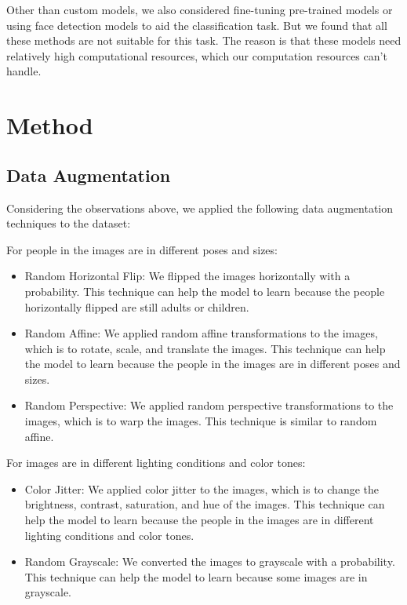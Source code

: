 \documentclass[12pt]{article}
\begin{document}
Other than custom models, we also considered fine-tuning pre-trained models or using face detection models to aid the classification task. But we found that all these methods are not suitable for this task. The reason is that these models need relatively high computational resources, which our computation resources can't handle.

\section{Method}

\subsection{Data Augmentation}

Considering the observations above, we applied the following data augmentation techniques to the dataset:

For people in the images are in different poses and sizes:
\begin{itemize}
    \item Random Horizontal Flip: We flipped the images horizontally with a probability. This technique can help the model to learn because the people horizontally flipped are still adults or children.
    \item Random Affine: We applied random affine transformations to the images, which is to rotate, scale, and translate the images. This technique can help the model to learn because the people in the images are in different poses and sizes.
    \item Random Perspective: We applied random perspective transformations to the images, which is to warp the images. This technique is similar to random affine.
\end{itemize}

For images are in different lighting conditions and color tones:
\begin{itemize}
    \item Color Jitter: We applied color jitter to the images, which is to change the brightness, contrast, saturation, and hue of the images. This technique can help the model to learn because the people in the images are in different lighting conditions and color tones.
    \item Random Grayscale: We converted the images to grayscale with a probability. This technique can help the model to learn because some images are in grayscale.
\end{itemize}
\end{document}
